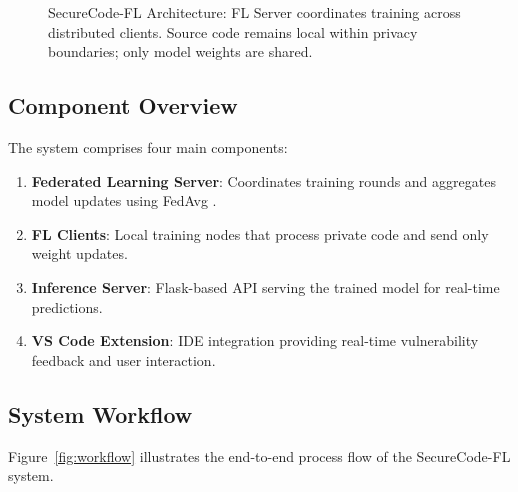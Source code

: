 \documentclass[conference]{IEEEtran}
\begin{document}
\begin{figure}[!t]
\begin{tikzpicture}[node distance=1cm, scale=0.9, transform shape]
\end{tikzpicture}
\caption{SecureCode-FL Architecture: FL Server coordinates training across distributed clients. Source code remains local within privacy boundaries; only model weights are shared.}
\label{fig:architecture}
\end{figure}

\subsection{Component Overview}

The system comprises four main components:

\begin{enumerate}
    \item \textbf{Federated Learning Server}: Coordinates training rounds and aggregates model updates using FedAvg \cite{mcmahan2017communication}.
    
    \item \textbf{FL Clients}: Local training nodes that process private code and send only weight updates.
    
    \item \textbf{Inference Server}: Flask-based API serving the trained model for real-time predictions.
    
    \item \textbf{VS Code Extension}: IDE integration providing real-time vulnerability feedback and user interaction.
\end{enumerate}

\subsection{System Workflow}

Figure~\ref{fig:workflow} illustrates the end-to-end process flow of the SecureCode-FL system.
\end{document}
